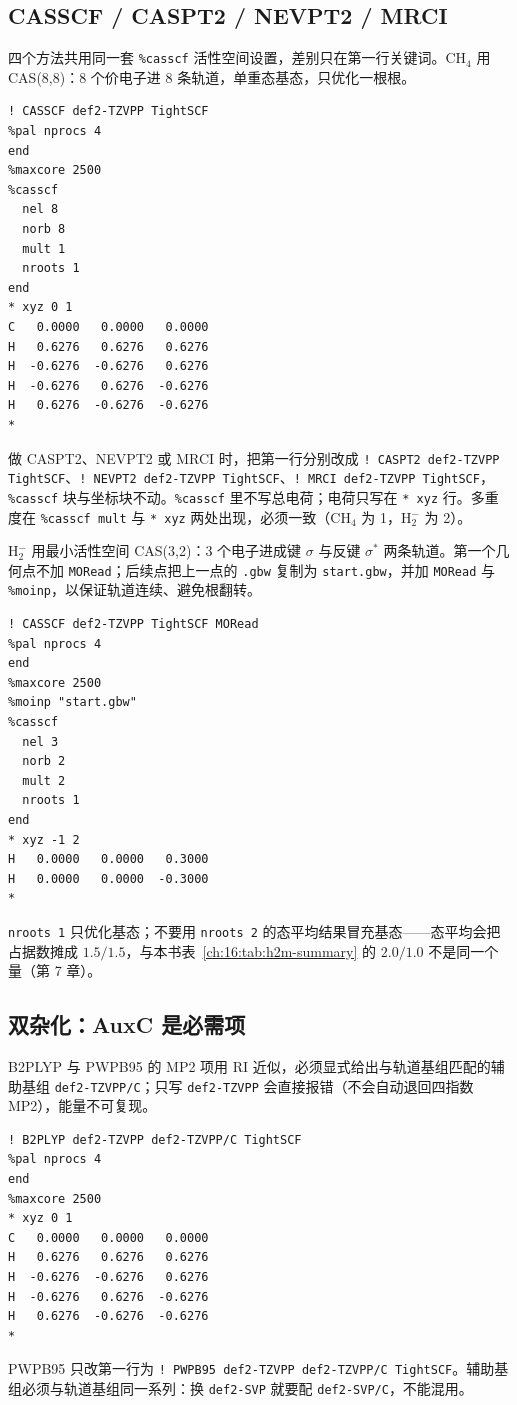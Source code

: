 \subsection{CASSCF / CASPT2 / NEVPT2 / MRCI}

四个方法共用同一套 \texttt{\%casscf} 活性空间设置，差别只在第一行关键词。CH$_4$ 用 CAS(8,8)：8 个价电子进 8 条轨道，单重态基态，只优化一根根。
\begin{lstlisting}
! CASSCF def2-TZVPP TightSCF
%pal nprocs 4
end
%maxcore 2500
%casscf
  nel 8
  norb 8
  mult 1
  nroots 1
end
* xyz 0 1
C   0.0000   0.0000   0.0000
H   0.6276   0.6276   0.6276
H  -0.6276  -0.6276   0.6276
H  -0.6276   0.6276  -0.6276
H   0.6276  -0.6276  -0.6276
*
\end{lstlisting}
做 CASPT2、NEVPT2 或 MRCI 时，把第一行分别改成 \texttt{! CASPT2 def2-TZVPP TightSCF}、\texttt{! NEVPT2 def2-TZVPP TightSCF}、\texttt{! MRCI def2-TZVPP TightSCF}，\texttt{\%casscf} 块与坐标块不动。\texttt{\%casscf} 里不写总电荷；电荷只写在 \texttt{* xyz} 行。多重度在 \texttt{\%casscf mult} 与 \texttt{* xyz} 两处出现，必须一致（CH$_4$ 为 1，H$_2^-$ 为 2）。

H$_2^-$ 用最小活性空间 CAS(3,2)：3 个电子进成键 $\sigma$ 与反键 $\sigma^*$ 两条轨道。第一个几何点不加 \texttt{MORead}；后续点把上一点的 \texttt{.gbw} 复制为 \texttt{start.gbw}，并加 \texttt{MORead} 与 \texttt{\%moinp}，以保证轨道连续、避免根翻转。
\begin{lstlisting}
! CASSCF def2-TZVPP TightSCF MORead
%pal nprocs 4
end
%maxcore 2500
%moinp "start.gbw"
%casscf
  nel 3
  norb 2
  mult 2
  nroots 1
end
* xyz -1 2
H   0.0000   0.0000   0.3000
H   0.0000   0.0000  -0.3000
*
\end{lstlisting}
\texttt{nroots 1} 只优化基态；不要用 \texttt{nroots 2} 的态平均结果冒充基态——态平均会把占据数摊成 $1.5/1.5$，与本书表~\ref{ch:16:tab:h2m-summary} 的 $2.0/1.0$ 不是同一个量（第 7 章）。

\subsection{双杂化：AuxC 是必需项}

B2PLYP 与 PWPB95 的 MP2 项用 RI 近似，必须显式给出与轨道基组匹配的辅助基组 \texttt{def2-TZVPP/C}；只写 \texttt{def2-TZVPP} 会直接报错（不会自动退回四指数 MP2），能量不可复现。
\begin{lstlisting}
! B2PLYP def2-TZVPP def2-TZVPP/C TightSCF
%pal nprocs 4
end
%maxcore 2500
* xyz 0 1
C   0.0000   0.0000   0.0000
H   0.6276   0.6276   0.6276
H  -0.6276  -0.6276   0.6276
H  -0.6276   0.6276  -0.6276
H   0.6276  -0.6276  -0.6276
*
\end{lstlisting}
PWPB95 只改第一行为 \texttt{! PWPB95 def2-TZVPP def2-TZVPP/C TightSCF}。辅助基组必须与轨道基组同一系列：换 \texttt{def2-SVP} 就要配 \texttt{def2-SVP/C}，不能混用。

